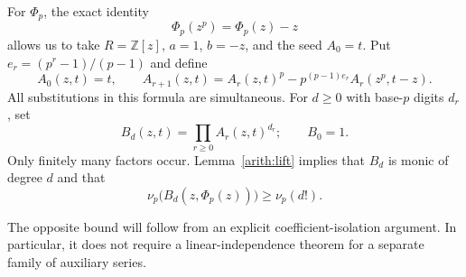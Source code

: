 \documentclass[11pt,a4paper]{article}
\theoremstyle{definition}
\theoremstyle{remark}\newtheorem{remark}[lemma]{Remark}
\begin{document}
For $\Phi_p$, the exact identity
\begin{equation}\label{arith:phifunctional}
 \Phi_p(z^p)=\Phi_p(z)-z
\end{equation}
allows us to take $R=\mathbb Z[z]$, $a=1$, $b=-z$, and the seed $A_0=t$.
Put $e_r=(p^r-1)/(p-1)$ and define
\begin{equation}\label{arith:Ar}
 A_0(z,t)=t,\qquad
 A_{r+1}(z,t)=A_r(z,t)^p-p^{(p-1)e_r}A_r(z^p,t-z).
\end{equation}
All substitutions in this formula are simultaneous. For $d\geq0$ with
base-$p$ digits $d_r$, set
\begin{equation}\label{arith:Bd}
 B_d(z,t)=\prod_{r\geq0} A_r(z,t)^{d_r};\qquad B_0=1.
\end{equation}
Only finitely many factors occur. Lemma~\ref{arith:lift} implies that $B_d$
is monic of degree $d$ and that
\begin{equation}\label{arith:upperval}
 \nu_p\bigl(B_d(z,\Phi_p(z))\bigr)\geq\nu_p(d!).
\end{equation}

The opposite bound will follow from an explicit coefficient-isolation
argument. In particular, it does not require a linear-independence theorem
for a separate family of auxiliary series.
\end{document}
